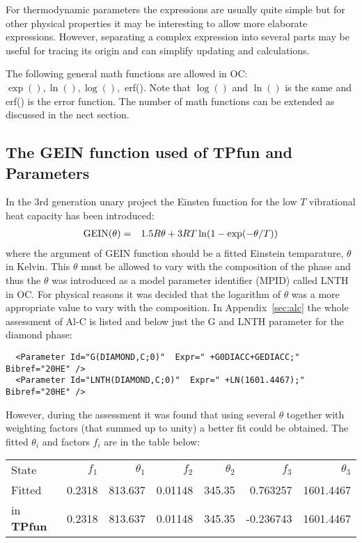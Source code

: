 \documentclass{article}
\begin{document}
For thermodynamic parameters the expressions are usually quite simple
but for other physical properties it may be interesting to allow more
elaborate expressions.  However, separating a complex expression into
several parts may be useful for tracing its origin and can simplify
updating and calculations.
  
The following general math functions are allowed in OC:\\ $\exp(),
\ln(), \log(),$ erf().  Note that $\log()$ and $\ln()$ is the same and
erf() is the error function.  The number of math functions can be
extended as discussed in the nect section.

\subsection{The GEIN function used of TPfun and Parameters}\label{sec:gein}

In the 3rd generation unary project the Einsten function for the low
$T$ vibrational heat capacity has been introduced:
\begin{eqnarray}
{\rm GEIN}(\theta) &=& 1.5R\theta+3RT\ln(1-\exp(-\theta/T)) \label{eq:gein}
\end{eqnarray}
where the argument of GEIN function should be a fitted Einstein
temparature, $\theta$ in Kelvin.  This $\theta$ must be allowed to
vary with the composition of the phase and thus the $\theta$ was
introduced as a model parameter identifier (MPID) called LNTH in OC.
For physical reasons it was decided that the logarithm of $\theta$ was
a more appropriate value to vary with the composition.  In
Appendix~\ref{sec:alc} the whole assessment of Al-C is listed and
below just the G and LNTH parameter for the diamond phase:

\begin{verbatim}
  <Parameter Id="G(DIAMOND,C;0)"  Expr=" +G0DIACC+GEDIACC;"  Bibref="20HE" />
  <Parameter Id="LNTH(DIAMOND,C;0)"  Expr=" +LN(1601.4467);"  Bibref="20HE" />
\end{verbatim}

However, during the assessment it was found that using several
$\theta$ together with weighting factors (that summed up to unity) a
better fit could be obtained.  The fitted $\theta_i$ and factors $f_i$
are in the table below:

\begin{tabular}{lrrrrrr}
State  & $f_1$   & $\theta_1$ & $f_2$   & $\theta_2$ & $f_3$  & $\theta_3$ \\
Fitted &  0.2318 & 813.637 & 0.01148 & 345.35 & 0.763257 & 1601.4467\\
in {\bf TPfun} &  0.2318 & 813.637 & 0.01148 & 345.35 & -0.236743 & 1601.4467\\
\end{tabular}
\end{document}
